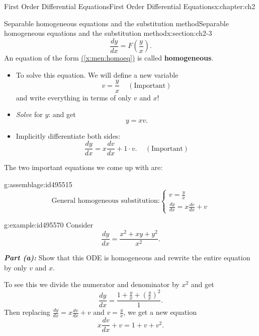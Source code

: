 \documentclass[oneside,10pt,]{book}
\newcommand{\xreffont}{\relax}
\newcommand{\alert}[1]{\textbf{\textit{#1}}}
\newcommand{\terminology}[1]{\textbf{#1}}
\numberwithin{equation}{section}
\numberwithin{equation}{section}
\begin{document}
\begin{chapterptx}{First Order Differential Equations}{}{First Order Differential Equations}{}{}{x:chapter:ch2}
\begin{sectionptx}{Separable homogeneous equations and the substitution method}{}{Separable homogeneous equations and the substitution method}{}{}{x:section:ch2-3}
\begin{equation}
\frac{dy}{dx}=F\left(\frac{y}{x}\right).\label{x:men:homoeq}
\end{equation}
An equation of the form \hyperref[x:men:homoeq]{({\xreffont\ref{x:men:homoeq}})} is called \terminology{homogeneous}.%
%
\begin{itemize}[label=\textbullet]
\item{}To solve this equation. We will define a new variable%
\begin{equation*}
v=\frac{y}{x}\,\,\,\,\,\,\,(\text{Important})
\end{equation*}
and write everything in terms of only \(v\) and \(x\)!%
\item{}\emph{Solve} for \(y\): and get%
\begin{equation*}
y=xv.
\end{equation*}
%
\item{}Implicitly differentiate both sides:%
\begin{equation*}
\frac{dy}{dx}=x\frac{dv}{dx}+1\cdot v.\,\,\,\,\,\,\,(\text{Important})
\end{equation*}
%
\end{itemize}
The two important equations we come up with are:%
\begin{assemblage}{}{g:assemblage:id495515}%
%
\begin{equation*}
\text{General homogeneous substitution:}\begin{cases}
v=\frac{y}{x}\\
\frac{dy}{dx}=x\frac{dv}{dx}+v
\end{cases}
\end{equation*}
%
\end{assemblage}
\begin{example}{}{g:example:id495570}%
Consider%
\begin{equation*}
\frac{dy}{dx}=\frac{x^{2}+xy+y^{2}}{x^{2}}.
\end{equation*}
%
\par
\alert{Part (a):} Show that this ODE is homogeneous and rewrite the entire equation by only \(v\) and \(x\).%
\par
To see this we divide the numerator and denominator by \(x^{2}\) and get%
\begin{equation*}
\frac{dy}{dx}=\frac{1+\frac{y}{x}+\left(\frac{y}{x}\right)^{2}}{1}.
\end{equation*}
Then replacing \(\frac{dy}{dx}=x\frac{dv}{dx}+v\) and \(v=\frac{y}{x}\), we get a new equation%
\begin{equation*}
x\frac{dv}{dx}+v=1+v+v^{2}.
\end{equation*}

\end{example}
\end{sectionptx}
\end{chapterptx}
\end{document}
